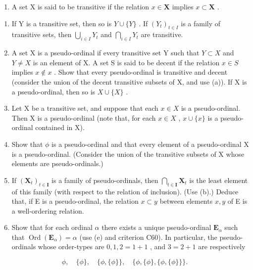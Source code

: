 \begin{enumerate}
\def\labelenumi{\arabic{enumi}.}
\setcounter{enumi}{19}
\tightlist
\item
  A set X is said to be transitive if the relation \(x \in \mathbf{X}\) implies \(x \subset \mathbf{X}\) .
\end{enumerate}

\begin{enumerate}
\def\labelenumi{(\alph{enumi})}
\item
  If Y is a transitive set, then so is \(Y \cup \{Y\}\) . If \((Y_{t})_{t \in I}\) is a family of transitive sets, then \(\bigcup_{i \in I} Y_{t}\) and \(\bigcap_{i \in I} Y_{t}\) are transitive.
\item
  A set X is a pseudo-ordinal if every transitive set Y such that \(Y \subset X\) and \(Y \neq X\) is an element of X. A set S is said to be decent if the relation \(x \in S\) implies \(x \notin x\) . Show that every pseudo-ordinal is transitive and decent (consider the union of the decent transitive subsets of X, and use (a)). If X is a pseudo-ordinal, then so is \(X \cup \{X\}\) .
\item
  Let X be a transitive set, and suppose that each \(x \in X\) is a pseudo-ordinal. Then X is a pseudo-ordinal (note that, for each \(x \in X\) , \(x \cup \{x\}\) is a pseudo-ordinal contained in X).
\item
  Show that \(\phi\) is a pseudo-ordinal and that every element of a pseudo-ordinal X is a pseudo-ordinal. (Consider the union of the transitive subsets of X whose elements are pseudo-ordinals.)
\item
  If \((\mathbf{X}_t)_{t\in \mathbf{I}}\) is a family of pseudo-ordinals, then \(\bigcap_{t\in \mathbf{I}}\mathbf{X}_t\) is the least element of this family (with respect to the relation of inclusion). (Use (b).) Deduce that, if E is a pseudo-ordinal, the relation \(x\subset y\) between elements \(x,y\) of E is a well-ordering relation.
\item
  Show that for each ordinal \(\alpha\) there exists a unique pseudo-ordinal \(\mathbf{E}_{\alpha}\) such that \(\operatorname{Ord}(\mathbf{E}_{\alpha}) = \alpha\) (use (e) and criterion C60). In particular, the pseudo-ordinals whose order-types are \(0, 1, 2 = 1 + 1\) , and \(3 = 2 + 1\) are respectively
\end{enumerate}

\[
\phi , \quad \{\phi \}, \quad \{\phi , \{\phi \} \}, \quad \{\phi , \{\phi \}, \{\phi , \{\phi \} \} \}.
\]

